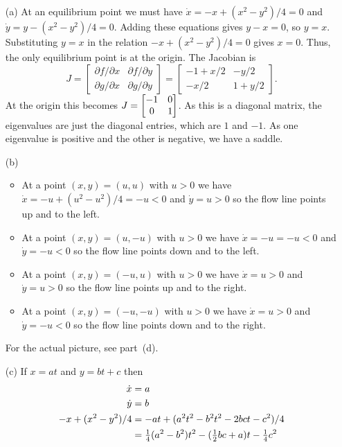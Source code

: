 \documentclass[a4paper]{amsart}
\begin{document}
\begin{solution}\leavevmode
 \begin{itemize}
  \item[(a)] At an equilibrium point we must have
   $\dot{x}=-x+(x^2-y^2)/4=0$ and $\dot{y}=y-(x^2-y^2)/4=0$.  Adding
   these equations gives $y-x=0$, so $y=x$.  Substituting $y=x$ in the
   relation $-x+(x^2-y^2)/4=0$ gives $x=0$.  Thus, the only
   equilibrium point is at the origin.  The Jacobian is 
   \[ J = \left[\begin{array}{cc} \partial f/\partial x & \partial f/\partial y \\
               \partial g/\partial x & \partial g/\partial y \end{array}\right]
        = \left[\begin{array}{cc} -1+x/2 & -y/2 \\
               -x/2 & 1+y/2 \end{array}\right].
   \]
   At the origin this becomes $J=\left[\begin{matrix} -1&0 \\ 0&1\end{matrix}\right]$.  As this is a
   diagonal matrix, the eigenvalues are just the diagonal entries,
   which are $1$ and $-1$.  As one eigenvalue is positive and the
   other is negative, we have a saddle.
  \item[(b)]
   \begin{itemize}
    \item At a point $(x,y)=(u,u)$ with $u>0$ we have
     $\dot{x}=-u+(u^2-u^2)/4=-u<0$ and $\dot{y}=u>0$ so the flow line
     points up and to the left. 
    \item At a point $(x,y)=(u,-u)$ with $u>0$ we have
     $\dot{x}=-u=-u<0$ and $\dot{y}=-u<0$ so the flow line points down
     and to the left.
    \item At a point $(x,y)=(-u,u)$ with $u>0$ we have
     $\dot{x}=u>0$ and $\dot{y}=u>0$ so the flow line points up
     and to the right.
    \item At a point $(x,y)=(-u,-u)$ with $u>0$ we have
     $\dot{x}=u>0$ and $\dot{y}=-u<0$ so the flow line points down
     and to the right.
   \end{itemize}
   For the actual picture, see part~(d).
  \item[(c)] If $x=at$ and $y=bt+c$ then
   \begin{align*}
    \dot{x} &= a \\
    \dot{y} &= b \\
    -x+(x^2-y^2)/4 &= -at + (a^2t^2-b^2t^2-2bct-c^2)/4 \\
      &= \tfrac{1}{4}(a^2-b^2)t^2 - (\half bc+a)t -\tfrac{1}{4}c^2 \\ 

\end{align*}
\end{itemize}
\end{solution}
\end{document}
